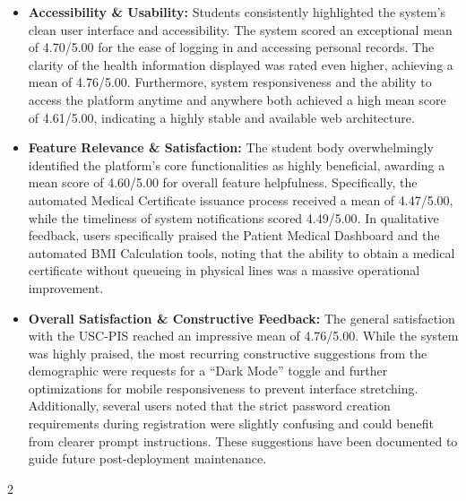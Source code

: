 \begin{itemize}
    \item \textbf{Accessibility \& Usability:} Students consistently highlighted the system's clean user interface and accessibility. The system scored an exceptional mean of 4.70/5.00 for the ease of logging in and accessing personal records. The clarity of the health information displayed was rated even higher, achieving a mean of 4.76/5.00. Furthermore, system responsiveness and the ability to access the platform anytime and anywhere both achieved a high mean score of 4.61/5.00, indicating a highly stable and available web architecture.
    \item \textbf{Feature Relevance \& Satisfaction:} The student body overwhelmingly identified the platform's core functionalities as highly beneficial, awarding a mean score of 4.60/5.00 for overall feature helpfulness. Specifically, the automated Medical Certificate issuance process received a mean of 4.47/5.00, while the timeliness of system notifications scored 4.49/5.00. In qualitative feedback, users specifically praised the Patient Medical Dashboard and the automated BMI Calculation tools, noting that the ability to obtain a medical certificate without queueing in physical lines was a massive operational improvement.
    \item \textbf{Overall Satisfaction \& Constructive Feedback:} The general satisfaction with the USC-PIS reached an impressive mean of 4.76/5.00. While the system was highly praised, the most recurring constructive suggestions from the demographic were requests for a ``Dark Mode'' toggle and further optimizations for mobile responsiveness to prevent interface stretching. Additionally, several users noted that the strict password creation requirements during registration were slightly confusing and could benefit from clearer prompt instructions. These suggestions have been documented to guide future post-deployment maintenance.
\end{itemize}

\begin{center}
    \begin{multicols}{2}
    \end{multicols}
\end{center}

